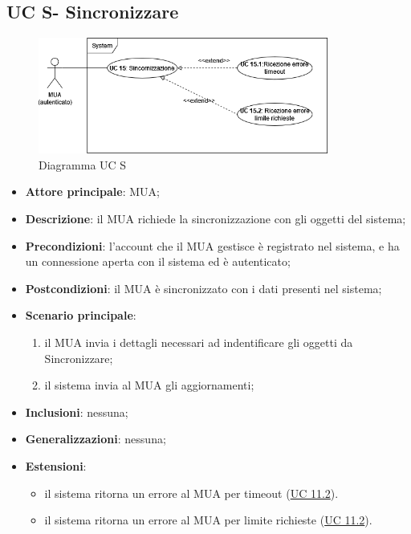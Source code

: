 \subsection{UC S- Sincronizzare} \label{sec:UCS}
    \begin{figure}[h]
        \includegraphics[width=0.85\textwidth]{sections/uc_imgs/UCS.png}
        \centering
        \caption{Diagramma UC S }
    \end{figure}
    \begin{itemize}
        \item \textbf{Attore principale}: MUA;
        \item \textbf{Descrizione}: il MUA richiede la sincronizzazione con gli oggetti del sistema;
        \item \textbf{Precondizioni}: l’account che il MUA gestisce è registrato nel sistema, e ha un connessione aperta con il sistema ed è autenticato;
        \item \textbf{Postcondizioni}: il MUA è sincronizzato con i dati presenti nel sistema;
        \item \textbf{Scenario principale}:
            \begin{enumerate}
                \item il MUA invia i dettagli necessari ad indentificare gli oggetti da Sincronizzare;
                \item il sistema invia al MUA gli aggiornamenti;
            \end{enumerate}
        \item \textbf{Inclusioni}: nessuna;
        \item \textbf{Generalizzazioni}: nessuna;
        \item \textbf{Estensioni}: 
        \begin{itemize}
            \item il sistema ritorna un errore al MUA per timeout (\hyperref[sec:UC11.2]{UC 11.2}).
            \item il sistema ritorna un errore al MUA per limite richieste (\hyperref[sec:UC11.2]{UC 11.2}).

        \end{itemize}
    \end{itemize}


